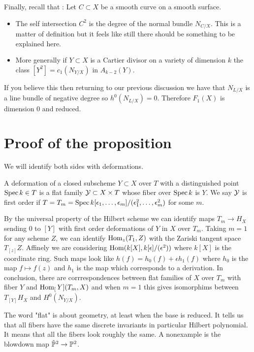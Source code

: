 \documentclass[12pt]{article}
\begin{document}
Finally, recall that : Let $C\subset X$ 
be a smooth curve on a smooth surface.
\begin{itemize}
    \item The self intersection $C^2$ is the degree of the normal bundle $N_{C/X}$. 
    This is a matter of definition but it feels like still there should be something
    to be explained here.
    \item More generally if $Y\subset X$ is a Cartier divisor on a variety of 
    dimension $k$ the class $[Y^2] = c_1(N_{Y/X})$ in $A_{k-2}(Y)$.
\end{itemize}
If you believe this then returning to our previous discussion
we have that $N_{L/X}$ is a line bundle of negative degree so $h^0(N_{L/X}) = 0$.
Therefore $F_1(X)$ is dimension $0$ and reduced.

\section{Proof of the proposition}
We will identify both sides with deformations.

\begin{definition}
    A deformation of a closed subscheme $Y\subset X$ over $T$ with a 
    distinguished point $\Spec k \in T$ is a flat family $\cY\subset X\times T$
    whose fiber over $\Spec k$ is $Y$. We say $\cY$ is first order if $T = T_m = 
    \Spec k[\epsilon_1,\ldots,\epsilon_m]/(\epsilon_1^2,\ldots,\epsilon_m^2)$
    for some $m$. 
\end{definition}
 
By the universal property of the Hilbert scheme we can identify maps $T_m\to H_X$ sending $0$ to 
$[Y]$ with first order deformations of $Y$ in $X$ over $T_m$. Taking $m=1$ for any scheme $Z$,
we can identify $\Hom_{z}(T_1,Z)$ with the Zariski tangent space $T_{[z]}Z$. Affinely we are considering
$\Hom(k[X], k[\epsilon]/(\epsilon^2))$ where $k[X]$ is the coordinate ring. Such maps look like 
$h(f) = h_0(f) + \epsilon h_1(f)$ where $h_0$ is the map $f\mapsto f(z)$ and $h_1$ is the map which 
corresponds to a derivation. In conclusion, there are corrrespondences between 
flat families of $X$ over $T_m$ with fiber $Y$ and $\Hom_[Y](T_m,X)$ and when $m=1$
this gives isomorphims between $T_{[Y]}H_X$ and $H^0(N_{Y/X})$.

\begin{remark}
    The word "flat" is about geometry, at least when the base is reduced. It tells us that all fibers 
    have the same discrete invariants in particular Hilbert polynomial. It means that
    all the fibers look roughly the same. A nonexample is the blowdown map $\tilde\P^2\to \P^2$.
\end{remark}
\end{document}
